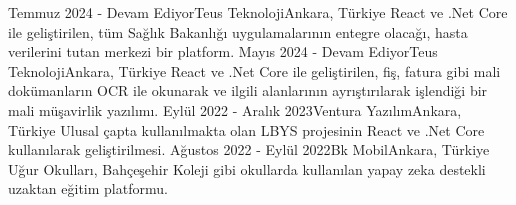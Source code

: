 \documentclass[
    10pt,
    A4,
    english,
    draft = false,
    twoside = false,
]{article}
\begin{document}
	 {Temmuz 2024 - Devam Ediyor}{Teus Teknoloji}{Ankara, Türkiye}
    {React ve .Net Core ile geliştirilen, tüm Sağlık Bakanlığı uygulamalarının entegre olacağı, hasta verilerini tutan merkezi bir platform.}
     {Mayıs 2024 - Devam Ediyor}{Teus Teknoloji}{Ankara, Türkiye}
    {React ve .Net Core ile geliştirilen, fiş, fatura gibi mali dokümanların OCR ile okunarak  ve ilgili alanlarının ayrıştırılarak işlendiği bir mali müşavirlik yazılımı.}
     {Eylül 2022 - Aralık 2023}{Ventura Yazılım}{Ankara, Türkiye}
    {Ulusal çapta kullanılmakta olan LBYS projesinin React ve .Net Core kullanılarak geliştirilmesi.}
     {Ağustos 2022 - Eylül 2022}{Bk Mobil}{Ankara, Türkiye}
    {Uğur Okulları, Bahçeşehir Koleji gibi okullarda kullanılan yapay zeka destekli uzaktan eğitim platformu.}
\end{document}
